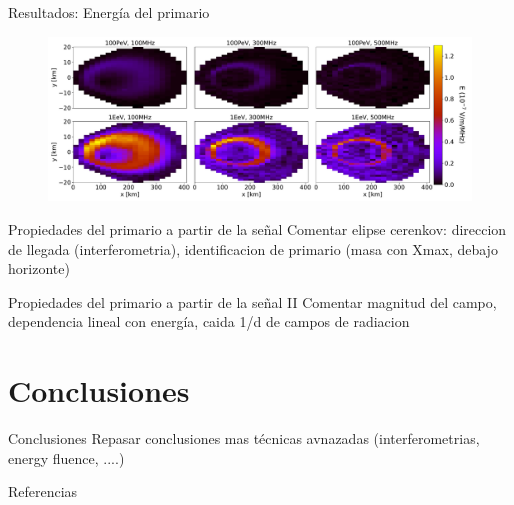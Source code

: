 \documentclass{beamer}
\begin{document}
\begin{frame}{Resultados: Energía del primario}
		\begin{figure}[H]
		\centering
		\includegraphics[width=1\linewidth]{figures/Radio_UG/85deg_varE}

	\end{figure}
\end{frame}

\begin{frame}{Propiedades del primario a partir de la señal}
	Comentar elipse cerenkov: direccion de llegada (interferometria), identificacion de primario (masa con Xmax, debajo horizonte)
\end{frame}

\begin{frame}{Propiedades del primario a partir de la señal II}
	Comentar magnitud del campo, dependencia lineal con energía, caida 1/d de campos de radiacion
\end{frame}
	\section{Conclusiones}
	\begin{frame}{Conclusiones}
		Repasar conclusiones mas técnicas avnazadas (interferometrias, energy fluence, ....)
	\end{frame}
	
	\begin{frame}{Referencias}
		\fontsize{9pt}{1}
		\nocite{*}
		
		
	\end{frame}
\end{document}
